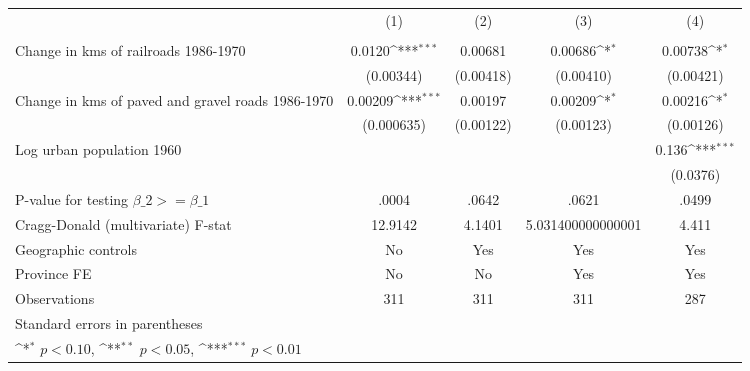 {
\def\sym#1{\ifmmode^{#1}\else\(^{#1}\)\fi}
\begin{tabular}{l*{4}{c}}
\hline\hline
                &\multicolumn{1}{c}{(1)}&\multicolumn{1}{c}{(2)}&\multicolumn{1}{c}{(3)}&\multicolumn{1}{c}{(4)}\\
                &\multicolumn{1}{c}{}&\multicolumn{1}{c}{}&\multicolumn{1}{c}{}&\multicolumn{1}{c}{}\\
\hline
Change in kms of railroads 1986-1970&   0.0120\sym{***}&  0.00681         &  0.00686\sym{*}  &  0.00738\sym{*}  \\
                &(0.00344)         &(0.00418)         &(0.00410)         &(0.00421)         \\
[1em]
Change in kms of paved and gravel roads 1986-1970&  0.00209\sym{***}&  0.00197         &  0.00209\sym{*}  &  0.00216\sym{*}  \\
                &(0.000635)         &(0.00122)         &(0.00123)         &(0.00126)         \\
[1em]
Log urban population 1960&                  &                  &                  &    0.136\sym{***}\\
                &                  &                  &                  & (0.0376)         \\
\hline
P-value for testing $\beta\_{2} >= \beta\_{1}$&    .0004         &    .0642         &    .0621         &    .0499         \\
Cragg-Donald (multivariate) F-stat&  12.9142         &   4.1401         &5.031400000000001         &    4.411         \\
Geographic controls&       No         &      Yes         &      Yes         &      Yes         \\
Province FE     &       No         &       No         &      Yes         &      Yes         \\
Observations    &      311         &      311         &      311         &      287         \\
\hline\hline
\multicolumn{5}{l}{\footnotesize Standard errors in parentheses}\\
\multicolumn{5}{l}{\footnotesize \sym{*} \(p<0.10\), \sym{**} \(p<0.05\), \sym{***} \(p<0.01\)}\\
\end{tabular}
}
